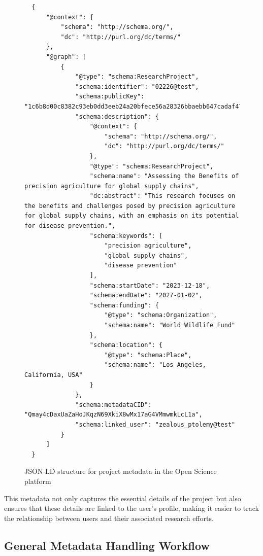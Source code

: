 \documentclass{article}
\begin{document}
\begin{figure}[h]
      \centering
      \caption{JSON-LD structure for project metadata in the Open Science platform}
      \label{jsonld:project}
      \begin{verbatim}
  {
      "@context": {
          "schema": "http://schema.org/",
          "dc": "http://purl.org/dc/terms/"
      },
      "@graph": [
          {
              "@type": "schema:ResearchProject",
              "schema:identifier": "02226@test",
              "schema:publicKey": "1c6b8d00c8382c93eb0dd3eeb24a20bfece56a28326bbaebb647cadaf4750520",
              "schema:description": {
                  "@context": {
                      "schema": "http://schema.org/",
                      "dc": "http://purl.org/dc/terms/"
                  },
                  "@type": "schema:ResearchProject",
                  "schema:name": "Assessing the Benefits of precision agriculture for global supply chains",
                  "dc:abstract": "This research focuses on the benefits and challenges posed by precision agriculture for global supply chains, with an emphasis on its potential for disease prevention.",
                  "schema:keywords": [
                      "precision agriculture",
                      "global supply chains",
                      "disease prevention"
                  ],
                  "schema:startDate": "2023-12-18",
                  "schema:endDate": "2027-01-02",
                  "schema:funding": {
                      "@type": "schema:Organization",
                      "schema:name": "World Wildlife Fund"
                  },
                  "schema:location": {
                      "@type": "schema:Place",
                      "schema:name": "Los Angeles, California, USA"
                  }
              },
              "schema:metadataCID": "Qmay4cDaxUaZaHoJKqzN69XkiX8wMx17aG4VMmwmkLcL1a",
              "schema:linked_user": "zealous_ptolemy@test"
          }
      ]
  }
  \end{verbatim}
\end{figure}


This metadata not only captures the essential details of the project but also ensures that these details are linked to the user's profile, making it easier to track the relationship between users and their associated research efforts.


\subsection{General Metadata Handling Workflow}
\end{document}
